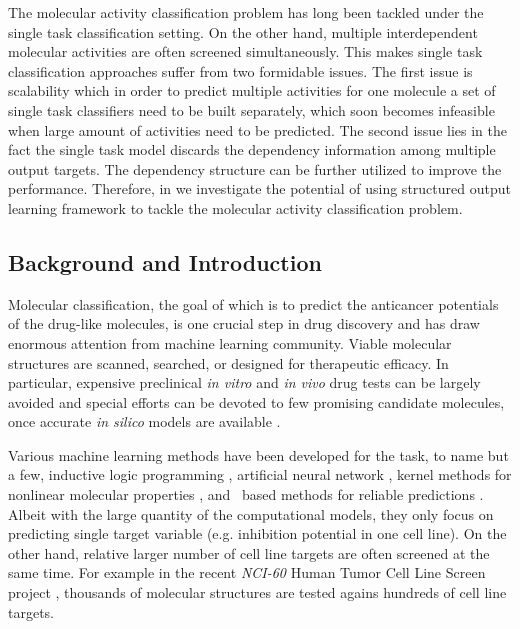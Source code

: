 {The molecular activity classification problem has long been tackled under the single task classification setting.
On the other hand, multiple interdependent molecular activities are often screened simultaneously.
This makes single task classification approaches suffer from two formidable issues.
The first issue is scalability which in order to predict multiple activities for one molecule a set of single task classifiers need to be built separately, which soon becomes infeasible when large amount of activities need to be predicted.
The second issue lies in the fact the single task model discards the dependency information among multiple output targets.
The dependency structure can be further utilized to improve the performance.
Therefore, in  we investigate the potential of using structured output learning framework to tackle the molecular activity classification problem.


\subsection{Background and Introduction}

Molecular classification, the goal of which is to predict the anticancer potentials of the drug-like molecules, is one crucial step in drug discovery and has draw enormous attention from machine learning community.
Viable molecular structures are scanned, searched, or designed for therapeutic efficacy.
In particular, expensive preclinical \textit{in vitro} and \textit{in vivo} drug tests can be largely avoided and special efforts can be devoted to few promising candidate molecules, once accurate \textit{in silico} models are available \citep{Burbidg01drug}.

Various machine learning methods have been developed for the task, to name but a few, inductive logic programming \citep{King96structure}, artificial neural network \citep{Bernazzani06predicting}, kernel methods for nonlinear molecular properties \citep{Trotter01drug,Ralaivola05graph,Swamidass05kernel,Ceroni07classification}, and \svm\ based methods for reliable predictions \citep{Trotter01drug,Byvatov03comparison,Xue04effect}.
Albeit with the large quantity of the computational models, they only focus on predicting single target variable (e.g. inhibition potential in one cell line). 
On the other hand, relative larger number of cell line targets are often screened at the same time.
For example in the recent \textit{NCI-60} {Human Tumor Cell Line Screen} project \citep{Shoemaker06the}, thousands of molecular structures are tested agains hundreds of cell line targets.


}

